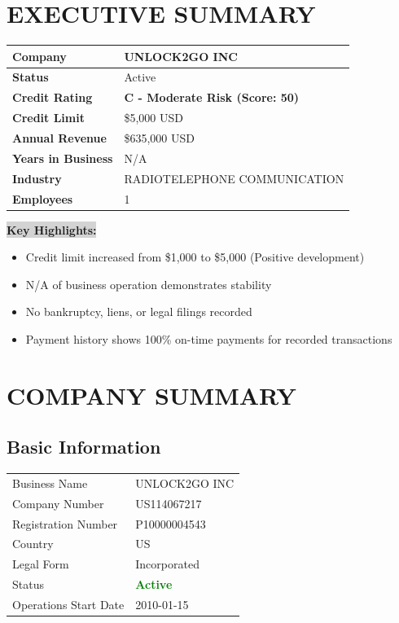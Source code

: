 \documentclass[11pt,a4paper]{article}
\newcommand{\creditrating}[1]{\textbf{\textcolor{uptrendblue}{#1}}}
\newcommand{\highlight}[1]{\colorbox{lightgray}{\textbf{#1}}}
\begin{document}
\newpage

\section*{EXECUTIVE SUMMARY}

\begin{tabular}{|p{3cm}|p{12cm}|}
\hline
\rowcolor{lightgray}
\textbf{Company} & UNLOCK2GO INC \\
\hline
\textbf{Status} & Active \\
\hline
\textbf{Credit Rating} & \creditrating{C - Moderate Risk (Score: 50)} \\
\hline
\textbf{Credit Limit} & \$5,000 USD \\
\hline
\textbf{Annual Revenue} & \$635,000 USD \\
\hline
\textbf{Years in Business} & N/A \\
\hline
\textbf{Industry} & RADIOTELEPHONE COMMUNICATION \\
\hline
\textbf{Employees} & 1 \\
\hline
\end{tabular}

\vspace{0.5cm}

\highlight{Key Highlights:}
\begin{itemize}[leftmargin=0.5cm]
    \item Credit limit increased from \$1,000 to \$5,000 (Positive development)
    \item N/A of business operation demonstrates stability
    \item No bankruptcy, liens, or legal filings recorded
    \item Payment history shows 100\% on-time payments for recorded transactions
\end{itemize}

\newpage

\tableofcontents

\newpage

\section{COMPANY SUMMARY}

\subsection{Basic Information}
\begin{tabularx}{\textwidth}{|l|X|}
\hline
\rowcolor{lightgray}
\multicolumn{2}{|c|}{\textbf{COMPANY IDENTIFICATION}} \\
\hline
Business Name & UNLOCK2GO INC \\
\hline
Company Number & US114067217 \\
\hline
Registration Number & P10000004543 \\
\hline
Country & US \\
\hline
Legal Form & Incorporated \\
\hline
Status & \textcolor{green}{\textbf{Active}} \\
\hline
Operations Start Date & 2010-01-15 \\
\hline
\end{tabularx}
\end{document}
